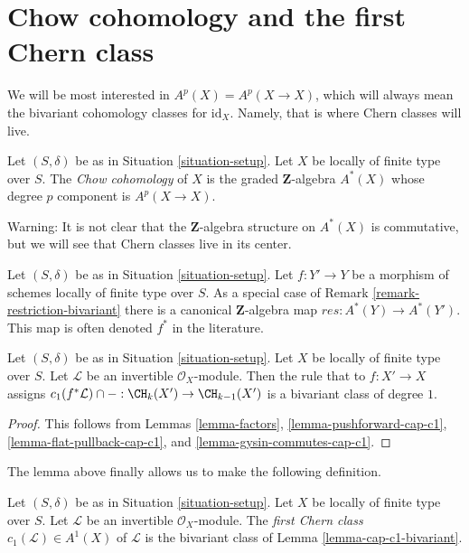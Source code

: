 \section{Chow cohomology and the first Chern class}
\label{section-chow-cohomology}

\noindent
We will be most interested in $A^p(X) = A^p(X \to X)$, which will always mean
the bivariant cohomology classes for $\text{id}_X$. Namely, that is where
Chern classes will live.

\begin{definition}
\label{definition-chow-cohomology}
Let $(S, \delta)$ be as in Situation \ref{situation-setup}.
Let $X$ be locally of finite type over $S$. The {\it Chow cohomology}
of $X$ is the graded $\mathbf{Z}$-algebra $A^*(X)$ whose degree
$p$ component is $A^p(X \to X)$.
\end{definition}

\noindent
Warning: It is not clear that the $\mathbf{Z}$-algebra structure
on $A^*(X)$ is commutative, but we will see that Chern classes live
in its center.

\begin{remark}
\label{remark-pullback-cohomology}
Let $(S, \delta)$ be as in Situation \ref{situation-setup}.
Let $f : Y' \to Y$ be a morphism of schemes locally of finite type over $S$.
As a special case of Remark \ref{remark-restriction-bivariant}
there is a canonical $\mathbf{Z}$-algebra map $res : A^*(Y) \to A^*(Y')$.
This map is often denoted $f^*$ in the literature.
\end{remark}

\begin{lemma}
\label{lemma-cap-c1-bivariant}
Let $(S, \delta)$ be as in Situation \ref{situation-setup}.
Let $X$ be locally of finite type over $S$.
Let $\mathcal{L}$ be an invertible $\mathcal{O}_X$-module.
Then the rule that to $f : X' \to X$ assigns
$c_1(f^*\mathcal{L}) \cap - : \CH_k(X') \to \CH_{k - 1}(X')$
is a bivariant class of degree $1$.
\end{lemma}

\begin{proof}
This follows from Lemmas \ref{lemma-factors},
\ref{lemma-pushforward-cap-c1},
\ref{lemma-flat-pullback-cap-c1}, and
\ref{lemma-gysin-commutes-cap-c1}.
\end{proof}

\noindent
The lemma above finally allows us to make the following definition.

\begin{definition}
\label{definition-first-chern-class}
Let $(S, \delta)$ be as in Situation \ref{situation-setup}. Let $X$
be locally of finite type over $S$. Let $\mathcal{L}$ be an invertible
$\mathcal{O}_X$-module. The {\it first Chern class}
$c_1(\mathcal{L}) \in A^1(X)$ of $\mathcal{L}$
is the bivariant class of Lemma \ref{lemma-cap-c1-bivariant}.
\end{definition}

